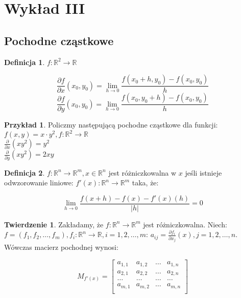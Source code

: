 \documentclass{article}
\theoremstyle{definition}
\newtheorem{de}{Definicja}[subsection]
\theoremstyle{definition}
\newtheorem{tw}{Twierdzenie}[subsection]
\theoremstyle{definition}
\newtheorem{pk}{Przykład}[subsection]
\theoremstyle{definition}
\theoremstyle{definition}
\theoremstyle{definition}
\theoremstyle{definition}
\begin{document}
\section{Wykład III}

\subsection{Pochodne cząstkowe}

\begin{de}
$f: \mathbb{R}^2\rightarrow\mathbb{R}$
    \begin{center}
    \[\frac{\partial f}{\partial x} (x_0,y_0) = \lim_{h\rightarrow 0} \frac{f(x_0+h,y_0)-f(x_0,y_0)}{h}\]
    \[\frac{\partial f}{\partial y} (x_0,y_0) = \lim_{h\rightarrow 0} \frac{f(x_0,y_0+h)-f(x_0,y_0)}{h}\]
    \end{center}
\end{de}

\begin{pk}
    Policzmy następującą pochodne cząstkowe dla funkcji:\\
    $f(x,y)=x\cdot y^2, f: \mathbb{R}^2\rightarrow \mathbb{R}$\\
    $\frac{\partial}{\partial x} (xy^2) = y^2$\\
    $\frac{\partial}{\partial y} (xy^2) = 2xy$\\
\end{pk}

\begin{de}
    $f:\mathbb{R}^n \rightarrow \mathbb{R}^m, x \in \mathbb{R}^n$ jest różniczkowalna w $x$ jeśli istnieje odwzorowanie liniowe:
        $f'(x):\mathbb{R}^n\rightarrow\mathbb{R}^m$ taka, że:
    \begin{center}
        \[\lim_{h\rightarrow 0} \frac{f(x+h)-f(x)-f'(x)(h)}{|h|}=0\]
    \end{center}
\end{de}

\begin{tw}
    Zakładamy, że $f:\mathbb{R}^n\rightarrow\mathbb{R}^m$ jest różniczkowalna. 
    Niech: $f=(f_1,f_2,\dots,f_m), f_{i}: \mathbb{R}^n\rightarrow\mathbb{R}, i = 1,2,\dots,m$:
    $a_{ij} = \frac{\partial f_i}{\partial x_j} (x), j = 1,2,\dots,n$. Wówczas macierz pochodnej wynosi:
    \begin{center}
        \[M_{f'(x)}=\begin{bmatrix}
            a_{1,1} & a_{1,2} & \dots & a_{1,n} \\
            a_{2,1} & a_{2,2} & \dots & a_{2,n} \\
            \dots & \dots & \dots & \dots \\
            a_{m,1} & a_{m,2} & \dots & a_{m,n} \\
            \end{bmatrix}\]
    \end{center}
\end{tw}
\end{document}
